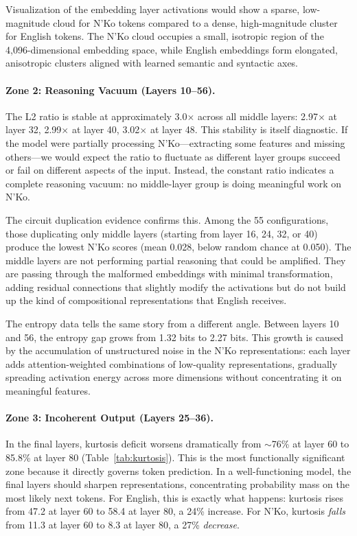 \documentclass[11pt]{article}
\begin{document}
Visualization of the embedding layer activations would show a sparse, low-magnitude cloud for N'Ko tokens compared to a dense, high-magnitude cluster for English tokens.
The N'Ko cloud occupies a small, isotropic region of the 4,096-dimensional embedding space, while English embeddings form elongated, anisotropic clusters aligned with learned semantic and syntactic axes.

\paragraph{Zone 2: Reasoning Vacuum (Layers 10--56).}
The L2 ratio is stable at approximately 3.0$\times$ across all middle layers: 2.97$\times$ at layer 32, 2.99$\times$ at layer 40, 3.02$\times$ at layer 48.
This stability is itself diagnostic.
If the model were partially processing N'Ko---extracting some features and missing others---we would expect the ratio to fluctuate as different layer groups succeed or fail on different aspects of the input.
Instead, the constant ratio indicates a complete reasoning vacuum: no middle-layer group is doing meaningful work on N'Ko.

The circuit duplication evidence confirms this.
Among the 55 configurations, those duplicating only middle layers (starting from layer 16, 24, 32, or 40) produce the lowest N'Ko scores (mean 0.028, below random chance at 0.050).
The middle layers are not performing partial reasoning that could be amplified.
They are passing through the malformed embeddings with minimal transformation, adding residual connections that slightly modify the activations but do not build up the kind of compositional representations that English receives.

The entropy data tells the same story from a different angle.
Between layers 10 and 56, the entropy gap grows from 1.32 bits to 2.27 bits.
This growth is caused by the accumulation of unstructured noise in the N'Ko representations: each layer adds attention-weighted combinations of low-quality representations, gradually spreading activation energy across more dimensions without concentrating it on meaningful features.

\paragraph{Zone 3: Incoherent Output (Layers 25--36).}
In the final layers, kurtosis deficit worsens dramatically from $\sim$76\% at layer 60 to 85.8\% at layer 80 (Table~\ref{tab:kurtosis}).
This is the most functionally significant zone because it directly governs token prediction.
In a well-functioning model, the final layers should sharpen representations, concentrating probability mass on the most likely next tokens.
For English, this is exactly what happens: kurtosis rises from 47.2 at layer 60 to 58.4 at layer 80, a 24\% increase.
For N'Ko, kurtosis \emph{falls} from 11.3 at layer 60 to 8.3 at layer 80, a 27\% \emph{decrease}.
\end{document}
